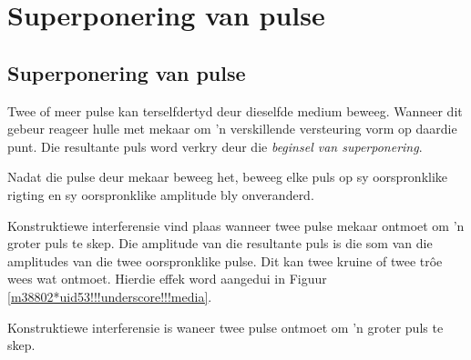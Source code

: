          \section{Superponering van pulse}
    \nopagebreak
\label{m38802*fs-id1166232432154}
            \subsection*{Superponering van pulse}
            \nopagebreak

Twee of meer pulse kan terselfdertyd deur dieselfde medium beweeg. Wanneer dit gebeur reageer hulle met mekaar om 'n verskillende versteuring vorm op daardie punt. Die resultante puls word verkry deur die \textsl{beginsel van superponering}.


Nadat die pulse deur mekaar beweeg het, beweeg elke puls op sy oorspronklike rigting en sy oorspronklike amplitude bly onveranderd. \par

Konstruktiewe interferensie vind plaas wanneer twee pulse mekaar ontmoet om 'n groter puls te skep. Die amplitude van die resultante puls is die som van die amplitudes van die twee oorspronklike pulse. Dit kan twee kruine of twee tr\^oe wees wat ontmoet. Hierdie effek word aangedui in Figuur \ref{m38802*uid53!!!underscore!!!media}.\par 

 {
     Konstruktiewe interferensie is waneer twee pulse ontmoet om 'n groter puls te skep.
       } 
	
